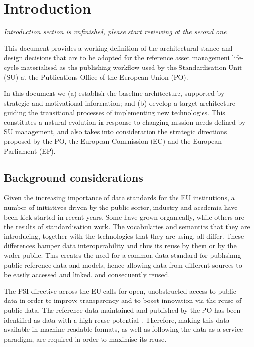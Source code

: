 \section{Introduction}
\label{sec:introduction}
	
	\textit{Introduction section is unfinished, please start reviewing at the second one}
	
	This document provides a working definition of the architectural stance and  design decisions that are to be adopted for the reference asset management life-cycle materialised as the publishing workflow used by the Standardisation Unit (SU) at the Publications Office of the European Union (PO).
	
	In this document we (a) establish the baseline architecture, supported by  strategic and motivational information; and (b) develop a target architecture guiding the transitional processes of implementing new technologies. This constitutes a natural evolution in response to changing mission needs defined by  SU management, and also takes into consideration the strategic directions proposed by the PO, the European Commission (EC) and the European Parliament (EP).
	
	
	\subsection{Background considerations}
	
	Given the increasing importance of data standards for the EU institutions, a number of initiatives driven by the public sector, industry and academia have been kick-started in recent years. Some have grown organically, while others are the results of standardisation work. The vocabularies and semantics that they are introducing, together with the technologies that they are using, all differ. These differences hamper data interoperability and thus its reuse by them or by the wider public. This creates the need for a common data standard for publishing public reference data and models, hence allowing data from different sources to be easily accessed and linked, and consequently reused.
	
	The PSI directive \cite{directive-2013/37/EU} across the EU calls for open, unobstructed access to public data in order to improve transparency and to boost innovation via the reuse of public data. The reference data maintained and published by the PO has been identified as data with a high-reuse potential \cite{d-high-value-assets}. Therefore, making this data available in machine-readable formats, as well as following the data as a service paradigm, are required in order to maximise its reuse.
	
